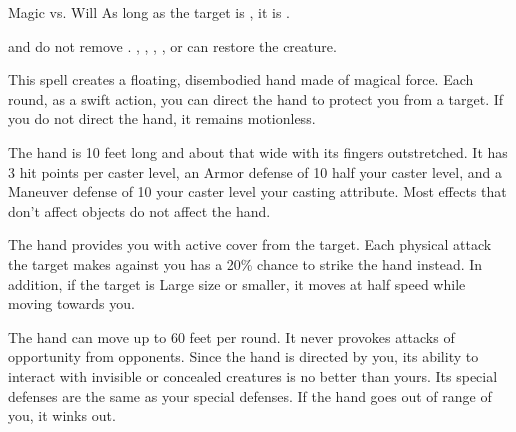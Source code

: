 \begin{spellheader}
    \spellrng{\rngclose}
\end{spellheader}
\begin{spelleffects}
    \begin{spellattack}{Magic vs. Will}
        \spellsuccess As long as the target is \bloodied, it is \confused.
    \end{spellattack}
\end{spelleffects}
\begin{spellfooter}
    \spellnotes {} and  do not remove . , , , , or  can restore the creature.
\end{spellfooter}

\begin{spellheader}
    \spellrng{\rngmed}
    \spelldur{\durshort \dismissable}
\end{spellheader}
\begin{spelleffects}
    \spelleffect This spell creates a floating, disembodied hand made of magical force. Each round, as a swift action, you can direct the hand to protect you from a target. If you do not direct the hand, it remains motionless.

    The hand is 10 feet long and about that wide with its fingers outstretched. It has 3 hit points per caster level, an Armor defense of 10 \add half your caster level, and a Maneuver defense of 10 \add your caster level \add your casting attribute. Most effects that don't affect objects do not affect the hand.

    \spelleffect The hand provides you with active cover from the target. Each physical attack the target makes against you has a 20\% chance to strike the hand instead. In addition, if the target is Large size or smaller, it moves at half speed while moving towards you.
\end{spelleffects}
\begin{spellfooter}
    \spellnotes The hand can move up to 60 feet per round. It never provokes attacks of opportunity from opponents. Since the hand is directed by you, its ability to interact with invisible or concealed creatures is no better than yours. Its special defenses are the same as your special defenses. If the hand goes out of range of you, it winks out.
\end{spellfooter}

